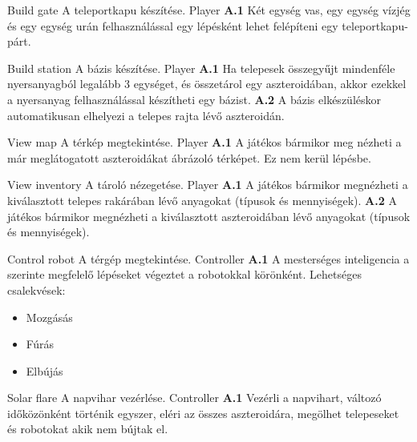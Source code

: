 \documentclass[../../projlab]{subfiles}
\begin{document}
\begin{use-case}
	{Build gate}
	{A teleportkapu készítése.}
	{Player}
    \textbf{A.1} Két egység vas, egy egység vízjég és egy egység urán felhasználással egy lépésként lehet felépíteni egy teleportkapu-párt.
\end{use-case}

\begin{use-case}
	{Build station}
	{A bázis készítése.}
	{Player}
    \textbf{A.1} Ha telepesek összegyűjt mindenféle nyersanyagból legalább 3 egységet, és összetárol egy aszteroidában, akkor ezekkel a nyersanyag felhasználással készítheti egy bázist.
	\newline
	\textbf{A.2} A bázis elkészüléskor automatikusan elhelyezi a telepes rajta lévő aszteroidán.
\end{use-case}

\begin{use-case}
	{View map}
	{A térkép megtekintése.}
	{Player}
    \textbf{A.1} A játékos bármikor meg nézheti a már meglátogatott aszteroidákat ábrázoló térképet. Ez nem kerül lépésbe.
\end{use-case}

\begin{use-case}
	{View inventory}
	{A tároló nézegetése.}
	{Player}
    \textbf{A.1} A játékos bármikor megnézheti a kiválasztott telepes rakárában lévő anyagokat (típusok és mennyiségek).
	\newline
	\textbf{A.2} A játékos bármikor megnézheti a kiválasztott aszteroidában lévő anyagokat (típusok és mennyiségek).
\end{use-case}

\begin{use-case}
	{Control robot}
	{A térgép megtekintése.}
	{Controller}
    \textbf{A.1} A mesterséges inteligencia a szerinte megfelelő lépéseket végeztet a robotokkal körönként.
	\newline
	Lehetséges csalekvések:
	\begin{itemize}
		\item Mozgásás
		\item Fúrás
		\item Elbújás
	\end{itemize}
		
\end{use-case}

\begin{use-case}
	{Solar flare}
	{A napvihar vezérlése.}
	{Controller}
    \textbf{A.1} Vezérli a napvihart, változó időközönként történik egyszer, eléri az összes aszteroidára, megölhet telepeseket és robotokat akik nem bújtak el.
\end{use-case}
\end{document}
